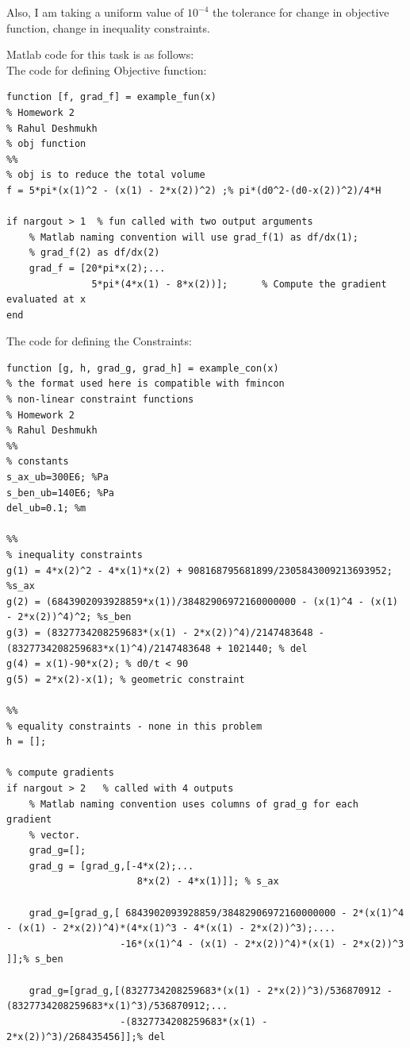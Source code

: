 \documentclass[12pt]{article}
\begin{document}
\begin{enumerate}[I]
\begin{enumerate}[1)]
Also, I am taking a uniform value of $10^{-4}$ the tolerance for change in objective function, change in inequality constraints. 

Matlab code for this task is as follows:\\

The code for defining Objective function:
\begin{lstlisting}
function [f, grad_f] = example_fun(x)
% Homework 2 
% Rahul Deshmukh
% obj function 
%%
% obj is to reduce the total volume
f = 5*pi*(x(1)^2 - (x(1) - 2*x(2))^2) ;% pi*(d0^2-(d0-x(2))^2)/4*H    

if nargout > 1  % fun called with two output arguments
    % Matlab naming convention will use grad_f(1) as df/dx(1); 
    % grad_f(2) as df/dx(2)
    grad_f = [20*pi*x(2);... 
               5*pi*(4*x(1) - 8*x(2))];      % Compute the gradient evaluated at x
end
\end{lstlisting}

The code for defining the Constraints:
\begin{lstlisting}
function [g, h, grad_g, grad_h] = example_con(x)
% the format used here is compatible with fmincon
% non-linear constraint functions 
% Homework 2 
% Rahul Deshmukh
%%
% constants
s_ax_ub=300E6; %Pa
s_ben_ub=140E6; %Pa
del_ub=0.1; %m

%%
% inequality constraints
g(1) = 4*x(2)^2 - 4*x(1)*x(2) + 908168795681899/2305843009213693952; %s_ax
g(2) = (6843902093928859*x(1))/38482906972160000000 - (x(1)^4 - (x(1) - 2*x(2))^4)^2; %s_ben
g(3) = (8327734208259683*(x(1) - 2*x(2))^4)/2147483648 - (8327734208259683*x(1)^4)/2147483648 + 1021440; % del
g(4) = x(1)-90*x(2); % d0/t < 90
g(5) = 2*x(2)-x(1); % geometric constraint

%%
% equality constraints - none in this problem
h = [];

% compute gradients
if nargout > 2   % called with 4 outputs
    % Matlab naming convention uses columns of grad_g for each gradient
    % vector. 
    grad_g=[];
    grad_g = [grad_g,[-4*x(2);...
                       8*x(2) - 4*x(1)]]; % s_ax
                  
    grad_g=[grad_g,[ 6843902093928859/38482906972160000000 - 2*(x(1)^4 - (x(1) - 2*x(2))^4)*(4*x(1)^3 - 4*(x(1) - 2*x(2))^3);....
                    -16*(x(1)^4 - (x(1) - 2*x(2))^4)*(x(1) - 2*x(2))^3 ]];% s_ben       
               
    grad_g=[grad_g,[(8327734208259683*(x(1) - 2*x(2))^3)/536870912 - (8327734208259683*x(1)^3)/536870912;...
                    -(8327734208259683*(x(1) - 2*x(2))^3)/268435456]];% del            
                 

\end{lstlisting}
\end{enumerate}
\end{enumerate}
\end{document}

